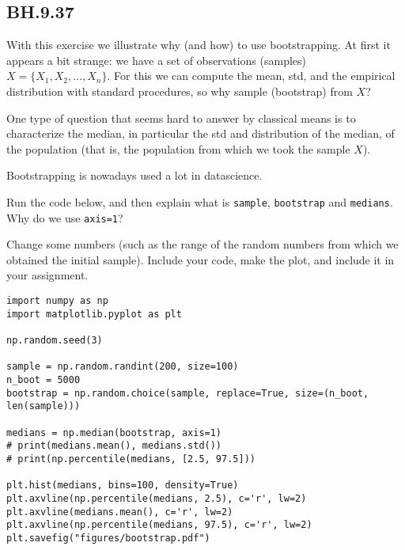 
\subsection{BH.9.37}

With this exercise we illustrate why (and how) to use bootstrapping. At first it appears a bit strange: we have a set of observations (samples) $X=\{X_{1}, X_2, \ldots, X_{n}\}$. For this we can compute the mean, std, and the empirical distribution with standard procedures, so why sample (bootstrap) from $X$?

One type of question that seems hard to answer by classical means is to characterize the median, in particular the std and distribution of the median, of the population (that is, the population from which we took the sample $X$).

Bootstrapping is nowadays used a lot in datascience.

\begin{exercise}
Run the code below, and then explain what is \texttt{sample}, \texttt{bootstrap} and \texttt{medians}. Why do we use \texttt{axis=1}?
\end{exercise}

\begin{exercise}
Change some numbers (such as the range of the random numbers from which we obtained the initial sample). Include your code,  make the plot, and include it in your assignment.
\end{exercise}

\begin{verbatim}
import numpy as np
import matplotlib.pyplot as plt

np.random.seed(3)

sample = np.random.randint(200, size=100)
n_boot = 5000
bootstrap = np.random.choice(sample, replace=True, size=(n_boot, len(sample)))

medians = np.median(bootstrap, axis=1)
# print(medians.mean(), medians.std())
# print(np.percentile(medians, [2.5, 97.5]))

plt.hist(medians, bins=100, density=True)
plt.axvline(np.percentile(medians, 2.5), c='r', lw=2)
plt.axvline(medians.mean(), c='r', lw=2)
plt.axvline(np.percentile(medians, 97.5), c='r', lw=2)
plt.savefig("figures/bootstrap.pdf")
\end{verbatim}


